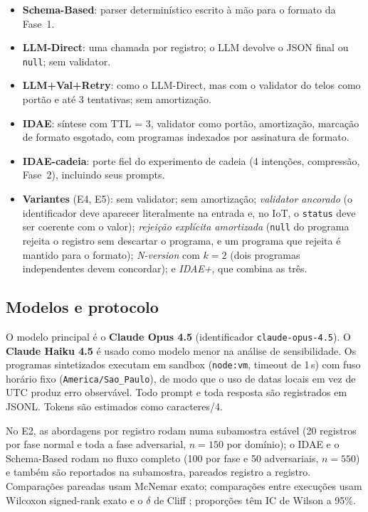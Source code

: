 \documentclass[sigconf,nonacm]{acmart}
\begin{document}
\begin{itemize}
\item \textbf{Schema-Based}: parser determinístico escrito à mão para o formato da Fase~1.
\item \textbf{LLM-Direct}: uma chamada por registro; o LLM devolve o JSON final ou \texttt{null}; sem validator.
\item \textbf{LLM+Val+Retry}: como o LLM-Direct, mas com o validator do telos como portão e até 3 tentativas; sem amortização.
\item \textbf{IDAE}: síntese com TTL = 3, validator como portão, amortização, marcação de formato esgotado, com programas indexados por assinatura de formato.
\item \textbf{IDAE-cadeia}: porte fiel do experimento de cadeia (4 intenções, compressão, Fase~2), incluindo seus prompts.
\item \textbf{Variantes} (E4, E5): sem validator; sem amortização; \textit{validator ancorado} (o identificador deve aparecer literalmente na entrada e, no IoT, o \texttt{status} deve ser coerente com o valor); \textit{rejeição explícita amortizada} (\texttt{null} do programa rejeita o registro sem descartar o programa, e um programa que rejeita é mantido para o formato); \textit{N-version} com $k=2$ (dois programas independentes devem concordar); e \textit{IDAE+}, que combina as três.
\end{itemize}

\subsection{Modelos e protocolo}

O modelo principal é o \textbf{Claude Opus 4.5} (identificador \texttt{claude-opus-4.5}). O \textbf{Claude Haiku 4.5} é usado como modelo menor na análise de sensibilidade. Os programas sintetizados executam em sandbox (\texttt{node:vm}, timeout de 1\,s) com fuso horário fixo (\texttt{America/\allowbreak Sao\_Paulo}), de modo que o uso de datas locais em vez de UTC produz erro observável. Todo prompt e toda resposta são registrados em JSONL. Tokens são estimados como caracteres/4.

No E2, as abordagens por registro rodam numa subamostra estável (20 registros por fase normal e toda a fase adversarial, $n = 150$ por domínio); o IDAE e o Schema-Based rodam no fluxo completo (100 por fase e 50 adversariais, $n = 550$) e também são reportados na subamostra, pareados registro a registro. Comparações pareadas usam McNemar exato; comparações entre execuções usam Wilcoxon signed-rank exato e o $\delta$ de Cliff \cite{arcuri2011practical}; proporções têm IC de Wilson a 95\%.
\end{document}
